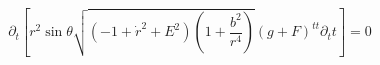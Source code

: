 \begin{equation}
\partial_t
\left[ r^2 \sin \theta \sqrt{(-1+\dot{r}^2+E^2)
\left(1+\frac{b^2}{r^4}\right)} (g+F)^{tt} \partial_t t\right]
= 0
\label{firsteq1}
\end{equation}

